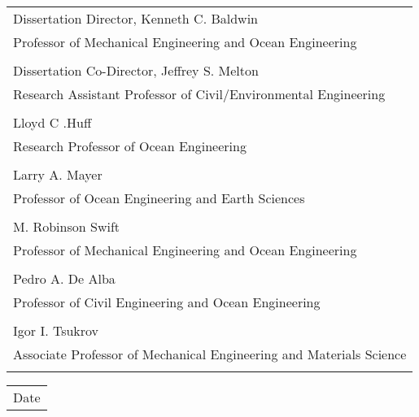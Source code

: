 \begin{flushright}

\begin{singlespace}
\tabletail
   {\hline {}\\}
\tablelasttail{}
\begin{supertabular}{p{13cm}}
      \hline
         Dissertation Director, Kenneth C. Baldwin \\
         Professor of Mechanical Engineering and Ocean Engineering \\
        \vspace{8.5mm}\\
      \hline
         Dissertation Co-Director, Jeffrey S. Melton \\
     Research Assistant Professor of Civil/Environmental Engineering \\
        \vspace{8.5mm}\\
      \hline
         Lloyd C .Huff \\
        Research Professor of Ocean Engineering \\
        \vspace{8.5mm}\\
      \hline
         Larry A. Mayer \\
         Professor of Ocean Engineering and Earth Sciences\\
        \vspace{8.5mm}\\
      \hline
         M. Robinson Swift \\
        Professor of Mechanical Engineering and Ocean Engineering\\
        \vspace{8.5mm}\\
      \hline
         Pedro A. De Alba\\
         Professor of Civil Engineering and Ocean Engineering \\
          \vspace{8.5mm}\\
      \hline
         Igor I. Tsukrov \\
         Associate Professor of Mechanical Engineering and Materials Science \\
                 \vspace{8.5mm}\\
    \end{supertabular}

    \begin{tabular*}{3in}{l}
      \hline
        Date
    \end{tabular*}

\end{singlespace}
\end{flushright}

